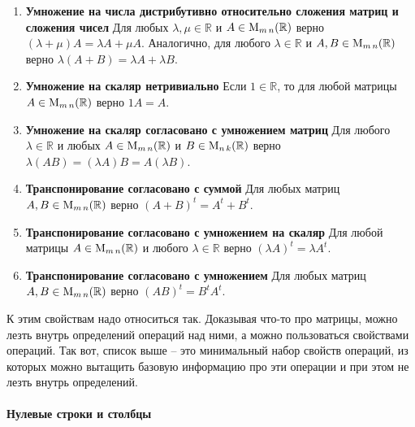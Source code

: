 \begin{enumerate}
\item {\bf Умножение на числа дистрибутивно относительно сложения матриц и сложения чисел}
Для любых $\lambda,\mu\in \mathbb R$ и $A\in \operatorname{M}_{m\,n}(\mathbb R)$ верно $(\lambda + \mu)A = \lambda A +\mu A$.
Аналогично, для любого $\lambda\in\mathbb R$ и $A,B\in\operatorname{M}_{m\,n}(\mathbb R)$ верно $\lambda(A+B) = \lambda A + \lambda B$.

\item {\bf Умножение на скаляр нетривиально}
Если $1\in\mathbb R$, то для любой матрицы $A\in \operatorname{M}_{m\,n}(\mathbb R)$ верно $1 A = A$.

\item {\bf Умножение на скаляр согласовано с умножением матриц}
Для любого $\lambda \in \mathbb R$ и любых $A\in\operatorname{M}_{m\,n}(\mathbb R)$ и $B\in\operatorname{M}_{n\,k}(\mathbb R)$ верно $\lambda(AB) = (\lambda A)B = A (\lambda B)$.

\item {\bf Транспонирование согласовано с суммой}
Для любых матриц $A, B\in\operatorname{M}_{m\,n}(\mathbb R)$ верно $(A+B)^t = A^t + B^t$.

\item {\bf Транспонирование согласовано с умножением на скаляр}
Для любой матрицы $A\in\operatorname{M}_{m\,n}(\mathbb R)$ и любого $\lambda\in\mathbb R$ верно $(\lambda A)^t = \lambda A^t$.

\item {\bf Транспонирование согласовано с умножением}
Для любых матриц $A, B\in\operatorname{M}_{m\,n}(\mathbb R)$ верно $(AB)^t = B^t A^t$.
\end{enumerate}

К этим свойствам надо относиться так.
Доказывая что-то про матрицы, можно лезть внутрь определений операций над ними, а можно пользоваться свойствами операций.
Так вот, список выше -- это минимальный набор свойств операций, из которых можно вытащить базовую информацию про эти операции и при этом не лезть внутрь определений.

\paragraph{Нулевые строки и столбцы}

